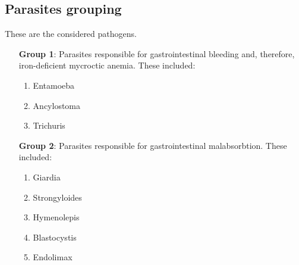 
\subsection{Parasites grouping}\label{sub:parasites}
These are the considered pathogens.

\begin{enumerate}[leftmargin=6em]
	\item [\textbf{Group 1}:] Parasites responsible for gastrointestinal bleeding and, therefore, iron-deficient mycroctic anemia. These included:
		\begin{enumerate}[label=\alph*)]
			\item Entamoeba
			\item Ancylostoma
			\item Trichuris
		\end{enumerate}
	\item [\textbf{Group 2}:] Parasites responsible for gastrointestinal malabsorbtion. These included:
		\begin{enumerate}[label=\alph*)]
			\item Giardia
			\item Strongyloides
			\item Hymenolepis
			\item Blastocystis
			\item Endolimax
		\end{enumerate}
\end{enumerate}


